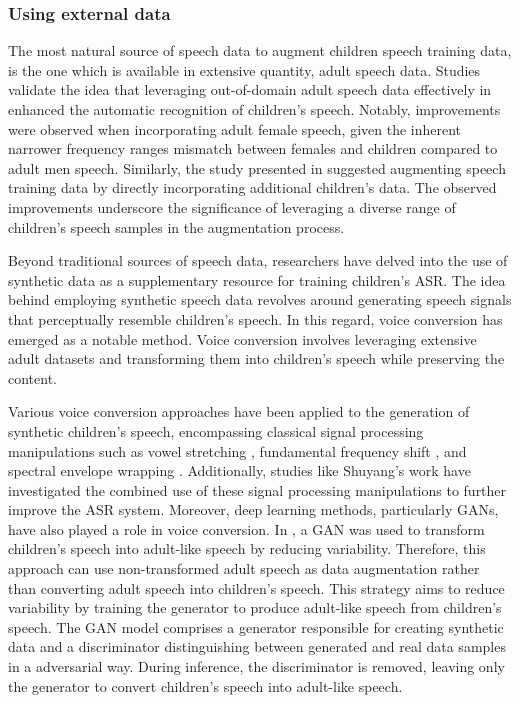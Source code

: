 \subsubsection{Using external data}

The most natural source of speech data to augment children speech training data, is the one which is available in extensive quantity, adult speech data. Studies \cite{adultAUGMENT1, adultAUGMENT2} validate the idea  that leveraging out-of-domain adult speech data effectively in enhanced the automatic recognition of children's speech. Notably, improvements were observed when incorporating adult female speech, given the inherent narrower frequency ranges mismatch between females and children compared to adult men speech.
Similarly, the study presented in \cite{nonnative} suggested augmenting speech training data by directly incorporating additional children's data. The observed improvements underscore the significance of leveraging a diverse range of children's speech samples in the augmentation process.


Beyond traditional sources of speech data, researchers have delved into the use of synthetic data as a supplementary resource for training children's \ac{ASR}. The idea behind employing synthetic speech data revolves around generating speech signals that perceptually resemble children's speech. In this regard, voice conversion has emerged as a notable method. Voice conversion involves leveraging extensive adult datasets and transforming them into children's speech while preserving the content.

Various voice conversion approaches have been applied to the generation of synthetic children's speech, encompassing classical signal processing manipulations such as vowel stretching \cite{nagano2019data}, fundamental frequency shift \cite{yeung2021fundamental}, and spectral envelope wrapping \cite{dua2022spectral}. Additionally, studies like Shuyang's work \cite{shuyangdata} have investigated the combined use of these signal processing manipulations to further improve the \ac{ASR} system. Moreover, deep learning methods, particularly \acp{GAN}, have also played a role in voice conversion. In \cite{GANS}, a \ac{GAN} was used to transform children's speech into adult-like speech by reducing variability. Therefore, this approach can use non-transformed adult speech as data augmentation rather than converting adult speech into children's speech. This strategy aims to reduce variability by training the generator to produce adult-like speech from children's speech. The \ac{GAN} model comprises a generator responsible for creating synthetic data and a discriminator distinguishing between generated and real data samples in a adversarial way. During inference, the discriminator is removed, leaving only the generator to convert children's speech into adult-like speech.



